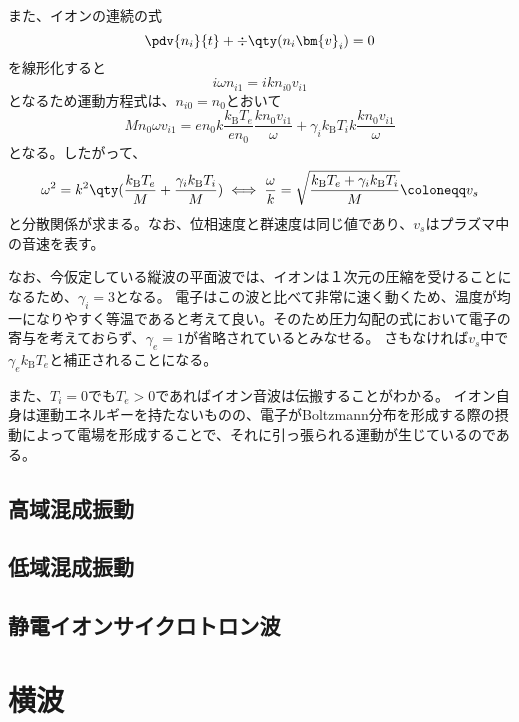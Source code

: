 また、イオンの連続の式
\begin{equation}
	\pdv{n_i}{t} + \div{\qty(n_i\bm{v}_i)} = 0
\end{equation}
を線形化すると
\begin{equation}
	i\omega{}n_{i1} = ikn_{i0}v_{i1}
\end{equation}
となるため運動方程式は、$n_{i0} = n_0$とおいて
\begin{equation}
	Mn_0\omega{}v_{i1} = en_0k\frac{k_{\text{B}}T_e}{en_0}\frac{kn_0v_{i1}}{\omega} + \gamma_ik_{\text{B}}T_ik\frac{kn_0v_{i1}}{\omega}
\end{equation}
となる。したがって、
\begin{equation}
	\omega^2 = k^2\qty(\frac{k_{\text{B}}T_e}{M} + \frac{\gamma_ik_{\text{B}}T_i}{M}) \iff \frac{\omega}{k} = \sqrt{\frac{k_{\text{B}}T_e + \gamma_ik_{\text{B}}T_i}{M}} \coloneqq v_s
\end{equation}
と分散関係が求まる。なお、位相速度と群速度は同じ値であり、$v_s$はプラズマ中の音速を表す。

なお、今仮定している縦波の平面波では、イオンは１次元の圧縮を受けることになるため、$\gamma_i = 3$となる。
電子はこの波と比べて非常に速く動くため、温度が均一になりやすく等温であると考えて良い。そのため圧力勾配の式において電子の寄与を考えておらず、$\gamma_e=1$が省略されているとみなせる。
さもなければ$v_s$中で$\gamma_ek_{\text{B}}T_e$と補正されることになる。

また、$T_i = 0$でも$T_e > 0$であればイオン音波は伝搬することがわかる。
イオン自身は運動エネルギーを持たないものの、電子がBoltzmann分布を形成する際の摂動によって電場を形成することで、それに引っ張られる運動が生じているのである。

\subsection{高域混成振動}
\subsection{低域混成振動}
\subsection{静電イオンサイクロトロン波}

\newpage
\section{横波}
